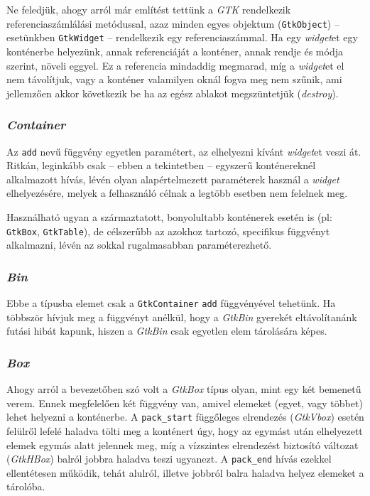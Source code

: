 \documentclass[a4paper,10pt]{article}
\begin{document}
Ne feledjük, ahogy arról már említést tettünk a \textit{GTK} rendelkezik referenciaszámlálási metódussal, azaz minden egyes objektum (\texttt{GtkObject}) -- esetünkben \texttt{GtkWidget} -- rendelkezik egy referenciaszámmal. Ha egy \textit{widget}et egy konténerbe helyezünk, annak referenciáját a konténer, annak rendje és módja szerint, növeli eggyel. Ez a referencia mindaddig megmarad, míg a \textit{widget}et el nem távolítjuk, vagy a konténer valamilyen oknál fogva meg nem szűnik, ami jellemzően akkor következik be ha az egész ablakot megszüntetjük (\textit{destroy}).

\subsubsection{\textit{Container}}

Az \texttt{add} nevű függvény egyetlen paramétert, az elhelyezni kívánt \textit{widget}et veszi át. Ritkán, leginkább csak -- ebben a tekintetben -- egyszerű konténereknél alkalmazott hívás, lévén olyan alapértelmezett paraméterek használ a \textit{widget} elhelyezésére, melyek a felhasználó célnak a legtöbb esetben nem felelnek meg.

Használható ugyan a származtatott, bonyolultabb konténerek esetén is (pl: \texttt{GtkBox}, \texttt{GtkTable}), de célszerűbb az azokhoz tartozó, specifikus függvényt alkalmazni, lévén az sokkal rugalmasabban paraméterezhető.

\subsubsection{\textit{Bin}}

Ebbe a típusba elemet csak a \texttt{GtkContainer} \texttt{add} függvényével tehetünk. Ha többször hívjuk meg a függvényt anélkül, hogy a \textit{GtkBin} gyerekét eltávolítanánk futási hibát kapunk, hiszen a \textit{GtkBin} csak egyetlen elem tárolására képes.

\subsubsection{\textit{Box}}

Ahogy arról a bevezetőben szó volt a \textit{GtkBox} típus olyan, mint egy két bemenetű verem. Ennek megfelelően két függvény van, amivel elemeket (egyet, vagy többet) lehet helyezni a konténerbe. A \texttt{pack\_start} függőleges elrendezés (\textit{GtkVbox}) esetén felülről lefelé haladva tölti meg a konténert úgy, hogy az egymást után elhelyezett elemek egymás alatt jelennek meg, míg a vízszintes elrendezést biztosító változat (\textit{GtkHBox}) balról jobbra haladva teszi ugyanezt. A \texttt{pack\_end} hívás ezekkel ellentétesen működik, tehát alulról, illetve jobbról balra haladva helyez elemeket a tárolóba.
\end{document}
